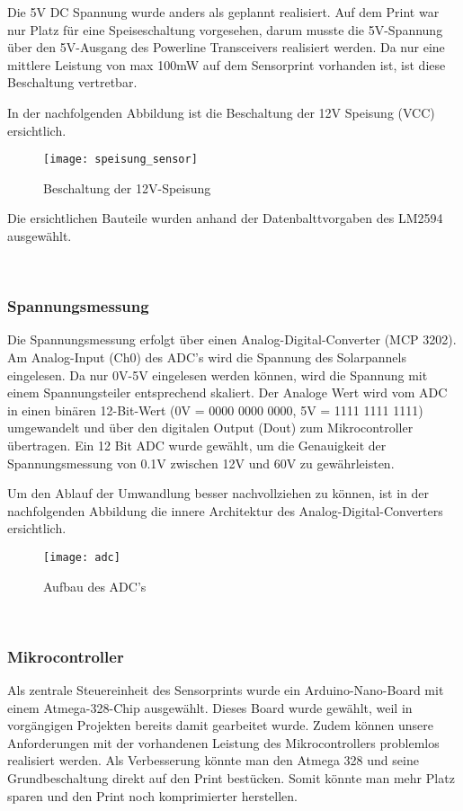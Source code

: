 Die 5V DC Spannung wurde anders als geplannt realisiert. Auf dem Print war nur Platz für eine Speiseschaltung vorgesehen, darum musste die 5V-Spannung über den 5V-Ausgang des Powerline Transceivers realisiert werden. Da nur eine mittlere Leistung von max 100mW auf dem Sensorprint vorhanden ist, ist diese Beschaltung vertretbar.

In der nachfolgenden Abbildung ist die Beschaltung der 12V Speisung (VCC) ersichtlich.


\begin{figure}[h]
\centering
\texttt{[image: speisung\_sensor]}
\caption{Beschaltung der 12V-Speisung}
\end{figure}

Die ersichtlichen Bauteile wurden anhand der Datenbalttvorgaben des LM2594 ausgewählt.

\
\
\subsubsection{Spannungsmessung}
Die Spannungsmessung erfolgt über einen Analog-Digital-Converter (MCP 3202). Am Analog-Input (Ch0) des ADC's wird die Spannung des Solarpannels eingelesen. Da nur 0V-5V eingelesen werden können, wird die Spannung mit einem Spannungsteiler entsprechend skaliert. Der Analoge Wert wird vom ADC in einen binären 12-Bit-Wert (0V = 0000 0000 0000, 5V = 1111 1111 1111) umgewandelt und über den digitalen Output (Dout) zum Mikrocontroller übertragen. Ein 12 Bit ADC wurde gewählt, um die Genauigkeit der Spannungsmessung von 0.1V zwischen 12V und 60V zu gewährleisten.

Um den Ablauf der Umwandlung besser nachvollziehen zu können, ist in der nachfolgenden Abbildung die innere Architektur des Analog-Digital-Converters ersichtlich.

\clearpage
\begin{figure}[h]
\centering
\texttt{[image: adc]}
\caption{Aufbau des ADC's \cite{Datasheet_adc}}
\end{figure}

\
\

\subsubsection{Mikrocontroller}
Als zentrale Steuereinheit des Sensorprints wurde ein Arduino-Nano-Board mit einem Atmega-328-Chip ausgewählt. Dieses Board wurde gewählt, weil in vorgängigen Projekten bereits damit gearbeitet wurde. Zudem können unsere Anforderungen mit der vorhandenen Leistung des Mikrocontrollers problemlos realisiert werden. Als Verbesserung könnte man den Atmega 328 und seine Grundbeschaltung direkt auf den Print bestücken. Somit könnte man mehr Platz sparen und den Print noch komprimierter herstellen.

